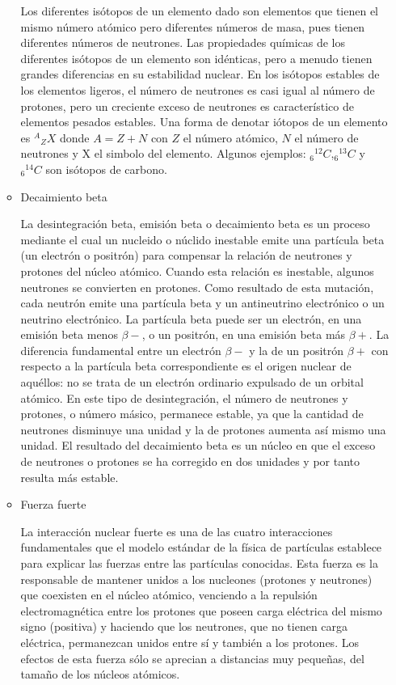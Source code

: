 \documentclass{article}
\begin{document}
\begin{enumerate}
\begin{itemize}
Los diferentes isótopos de un elemento dado son elementos que tienen el mismo número atómico pero diferentes números de masa, pues tienen diferentes números de neutrones. Las propiedades químicas de los diferentes isótopos de un elemento son idénticas, pero a menudo tienen grandes diferencias en su estabilidad nuclear. En los isótopos estables de los elementos ligeros, el número de neutrones es casi igual al número de protones, pero un creciente exceso de neutrones es característico de elementos pesados estables. Una forma de denotar iótopos de un elemento es ${^A}{{_Z}X}$ donde $A=Z+N$ con $Z$ el número atómico, $N$ el número de neutrones y X el simbolo del elemento. Algunos ejemplos: ${_6}{^{12}}C$,${_6}{^{13}}C$ y ${_6}{^{14}}C$ son isótopos de carbono.

\item Decaimiento beta

La desintegración beta, emisión beta o decaimiento beta es un proceso mediante el cual un nucleido o núclido inestable emite una partícula beta (un electrón o positrón) para compensar la relación de neutrones y protones del núcleo atómico.
Cuando esta relación es inestable, algunos neutrones se convierten en protones. Como resultado de esta mutación, cada neutrón emite una partícula beta y un antineutrino electrónico o un neutrino electrónico.
La partícula beta puede ser un electrón, en una emisión beta menos $\beta - $, o un positrón, en una emisión beta más $ \beta +$. La diferencia fundamental entre un electrón $\beta - $ y la de un positrón $\beta + $ con respecto a la partícula beta correspondiente es el origen nuclear de aquéllos: no se trata de un electrón ordinario expulsado de un orbital atómico.
En este tipo de desintegración, el número de neutrones y protones, o número másico, permanece estable, ya que la cantidad de neutrones disminuye una unidad y la de protones aumenta así mismo una unidad. El resultado del decaimiento beta es un núcleo en que el exceso de neutrones o protones se ha corregido en dos unidades y por tanto resulta más estable.

\item Fuerza fuerte

La interacción nuclear fuerte es una de las cuatro interacciones fundamentales que el modelo estándar de la física de partículas establece para explicar las fuerzas entre las partículas conocidas.
Esta fuerza es la responsable de mantener unidos a los nucleones (protones y neutrones) que coexisten en el núcleo atómico, venciendo a la repulsión electromagnética entre los protones que poseen carga eléctrica del mismo signo (positiva) y haciendo que los neutrones, que no tienen carga eléctrica, permanezcan unidos entre sí y también a los protones.
Los efectos de esta fuerza sólo se aprecian a distancias muy pequeñas, del tamaño de los núcleos atómicos.
\end{itemize}
\end{enumerate}
\end{document}
